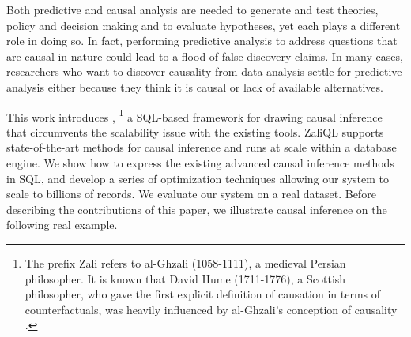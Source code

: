 Both predictive and causal analysis are needed to generate and test theories,
policy and decision making and to evaluate hypotheses, yet each plays a different role in doing so.
In fact, performing predictive analysis to address questions that are causal in nature could lead to a flood of false discovery claims.
In many cases, researchers who want to discover causality from data analysis settle for predictive analysis
either because they think it is causal or lack of available alternatives.

This work introduces \GSQL,
\footnote{
  The prefix Zali refers to al-Ghzali (1058-1111),
  a medieval Persian philosopher.
  It is known that David Hume (1711-1776), a Scottish philosopher,
  who gave the first explicit definition of causation in terms of counterfactuals,
  was heavily influenced by al-Ghzali's conception of causality \cite{shalizi2013advanced}.
}
a SQL-based framework for drawing causal inference that circumvents the scalability issue with the existing tools.
ZaliQL supports state-of-the-art methods for causal inference and runs at scale within a database engine.
We show how to express the existing advanced causal inference methods in SQL,
and develop a series of optimization techniques allowing our system to scale to billions of records.
We evaluate our system on a real dataset.
Before describing the contributions of this paper,
we illustrate causal inference on the following real example.

